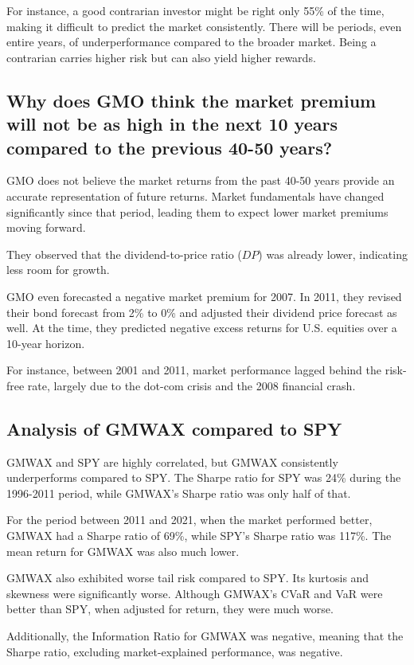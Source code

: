 \documentclass{article}
\begin{document}
For instance, a good contrarian investor might be right only 55\% of the time, making it difficult to predict the market consistently. There will be periods, even entire years, of underperformance compared to the broader market. Being a contrarian carries higher risk but can also yield higher rewards.

\subsection{Why does GMO think the market premium will not be as high in the next 10 years compared to the previous 40-50 years?}
GMO does not believe the market returns from the past 40-50 years provide an accurate representation of future returns. Market fundamentals have changed significantly since that period, leading them to expect lower market premiums moving forward.

They observed that the dividend-to-price ratio ($DP$) was already lower, indicating less room for growth.

GMO even forecasted a negative market premium for 2007. In 2011, they revised their bond forecast from 2\% to 0\% and adjusted their dividend price forecast as well. At the time, they predicted negative excess returns for U.S. equities over a 10-year horizon.

For instance, between 2001 and 2011, market performance lagged behind the risk-free rate, largely due to the dot-com crisis and the 2008 financial crash.

\subsection{Analysis of GMWAX compared to SPY}
GMWAX and SPY are highly correlated, but GMWAX consistently underperforms compared to SPY. The Sharpe ratio for SPY was 24\% during the 1996-2011 period, while GMWAX's Sharpe ratio was only half of that. 

For the period between 2011 and 2021, when the market performed better, GMWAX had a Sharpe ratio of 69\%, while SPY’s Sharpe ratio was 117\%. The mean return for GMWAX was also much lower.

GMWAX also exhibited worse tail risk compared to SPY. Its kurtosis and skewness were significantly worse. Although GMWAX's CVaR and VaR were better than SPY, when adjusted for return, they were much worse.

Additionally, the Information Ratio for GMWAX was negative, meaning that the Sharpe ratio, excluding market-explained performance, was negative.
\end{document}
